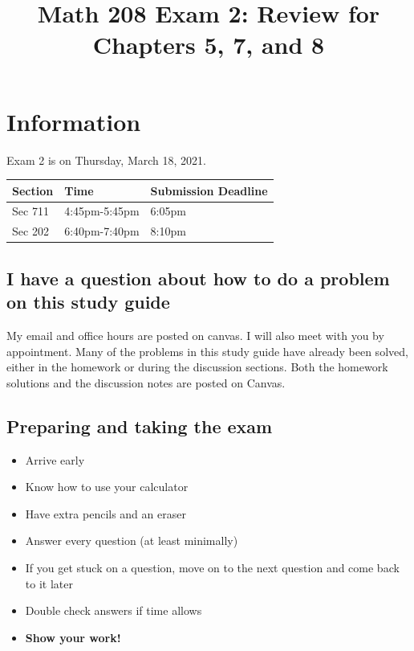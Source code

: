 \documentclass[12pt]{article}
\begin{document}
\title{\vspace{-5ex}Math 208 Exam 2: Review for Chapters 5, 7, and 8}
\author{}
\date{\vspace{-5ex}}
\maketitle

\section*{Information}

Exam 2 is on Thursday, March 18, 2021.

\begin{table}[h]
\begin{tabular}{lll}
\hline
\textbf{Section} & \textbf{Time} & \textbf{Submission Deadline}   \\ \hline
Sec 711          & 4:45pm-5:45pm  & 6:05pm \\ \hline
Sec 202          & 6:40pm-7:40pm	& 8:10pm  \\ \hline
\end{tabular}
\end{table}

\subsection*{I have a question about how to do a problem on this study guide}
My email and office hours are posted on canvas. I will also meet with you by appointment. Many of the problems in this study guide have already been solved, either in the homework or during the discussion sections. Both the homework solutions and the discussion notes are posted on Canvas.

\subsection*{Preparing and taking the exam}
\begin{itemize}
\item Arrive early
\item Know how to use your calculator
\item Have extra pencils and an eraser
\item Answer every question (at least minimally)
\item If you get stuck on a question, move on to the next question and come back to it later
\item Double check answers if time allows
\item \textbf{Show your work!}
\end{itemize}
\end{document}
